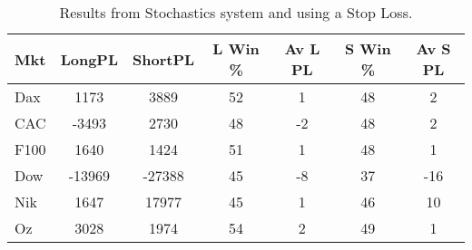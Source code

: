 \begin{table}[ht]
\centering
\caption[Stochastics system with stop loss]{Results from Stochastics system and using a Stop Loss.} 
\label{tab:stoch_results_sloss}
\begin{tabular}{lcccccc}
  \toprule Mkt & LongPL & ShortPL & L Win \% & Av L PL & S Win \% & Av S PL \\ 
  \midrule Dax & 1173 & 3889 & 52 & 1 & 48 & 2 \\ 
  CAC & -3493 & 2730 & 48 & -2 & 48 & 2 \\ 
  F100 & 1640 & 1424 & 51 & 1 & 48 & 1 \\ 
  Dow & -13969 & -27388 & 45 & -8 & 37 & -16 \\ 
  Nik & 1647 & 17977 & 45 & 1 & 46 & 10 \\ 
  Oz & 3028 & 1974 & 54 & 2 & 49 & 1 \\ 
   \bottomrule \end{tabular}
\end{table}
